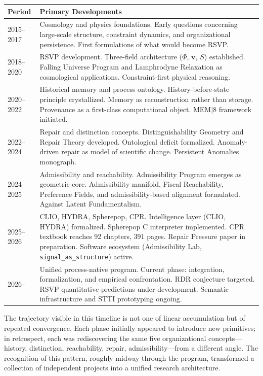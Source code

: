 \documentclass[11pt, oneside]{book}
\theoremstyle{definition}
\theoremstyle{remark}
\begin{document}
\begin{center}
\begin{tabular}{lp{9.5cm}}
\toprule
Period & Primary Developments \\
\midrule
2015--2017 & Cosmology and physics foundations. Early questions concerning
             large-scale structure, constraint dynamics, and organizational
             persistence. First formulations of what would become RSVP. \\[4pt]
2018--2020 & RSVP development. Three-field architecture ($\Phi$, $\mathbf{v}$, $S$)
             established. Falling Universe Program and Lamphrodyne Relaxation
             as cosmological applications. Constraint-first physical reasoning. \\[4pt]
2020--2022 & Historical memory and process ontology. History-before-state
             principle crystallized. Memory as reconstruction rather than
             storage. Provenance as a first-class computational object.
             MEM$|$8 framework initiated. \\[4pt]
2022--2024 & Repair and distinction concepts. Distinguishability Geometry
             and Repair Theory developed. Ontological deficit formalized.
             Anomaly-driven repair as model of scientific change.
             Persistent Anomalies monograph. \\[4pt]
2024--2025 & Admissibility and reachability. Admissibility Program emerges
             as geometric core. Admissibility manifold, Fiscal Reachability,
             Preference Fields, and admissibility-based alignment formulated.
             Against Latent Fundamentalism. \\[4pt]
2025--2026 & CLIO, HYDRA, Spherepop, CPR. Intelligence layer (CLIO, HYDRA)
             formalized. Spherepop C interpreter implemented. CPR textbook
             reaches 92 chapters, 391 pages. Repair Pressure paper in
             preparation. Software ecosystem (Admissibility Lab,
             \texttt{signal\_as\_structure}) active. \\[4pt]
2026--     & Unified process-native program. Current phase: integration,
             formalization, and empirical confrontation. RDR conjecture
             targeted. RSVP quantitative predictions under development.
             Semantic infrastructure and STTI prototyping ongoing. \\
\bottomrule
\end{tabular}
\end{center}

The trajectory visible in this timeline is not one of linear accumulation but of repeated convergence. Each phase initially appeared to introduce new primitives; in retrospect, each was rediscovering the same five organizational concepts---history, distinction, reachability, repair, admissibility---from a different angle. The recognition of this pattern, roughly midway through the program, transformed a collection of independent projects into a unified research architecture.
\end{document}
